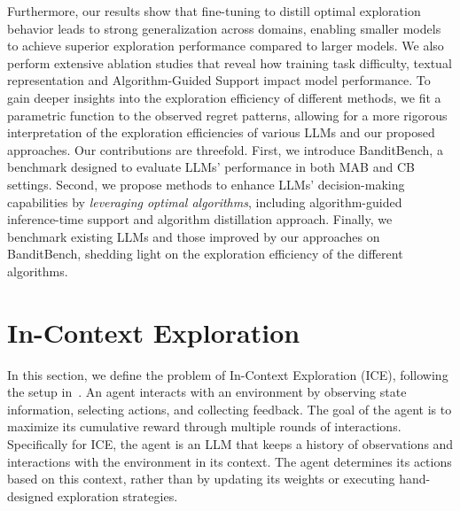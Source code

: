 \documentclass[11pt, logo]{googledeepmind}
\newcommand{\ICE}{ICE\xspace}
\newcommand{\ag}{Algorithm-Guided Support\xspace}
\newcommand{\ad}{algorithm distillation\xspace}
\theoremstyle{plain}
\theoremstyle{definition}
\begin{document}
Furthermore, our results show that fine-tuning to distill optimal exploration behavior leads to strong generalization across domains, enabling smaller models to achieve superior exploration performance compared to larger models.
We also perform extensive ablation studies that reveal how training task difficulty, textual representation and \ag impact model performance.
To gain deeper insights into the exploration efficiency of different methods, we fit a parametric function to the observed regret patterns, allowing for a more rigorous interpretation of the exploration efficiencies of various LLMs and our proposed approaches.
Our contributions are threefold. First, we introduce BanditBench, a benchmark designed to evaluate LLMs' performance in both MAB and CB settings. Second, we propose methods to enhance LLMs' decision-making capabilities by \emph{leveraging optimal algorithms}, including algorithm-guided inference-time support and \ad approach. Finally, we benchmark existing LLMs and those improved by our approaches on BanditBench, shedding light on the exploration efficiency of the different algorithms.
\section{In-Context Exploration}
\label{sec: icdm}
In this section, we define the problem of In-Context Exploration (\ICE), following the setup in~\cite{krishnamurthy2024can}. An agent interacts with an environment by observing state information, selecting actions, and collecting feedback. The goal of the agent is to maximize its cumulative reward through multiple rounds of interactions.
Specifically for \ICE, the agent is an LLM that keeps a history of observations and interactions with the environment in its context. The agent determines its actions based on this context, rather than by updating its weights or executing hand-designed exploration strategies.
\end{document}
